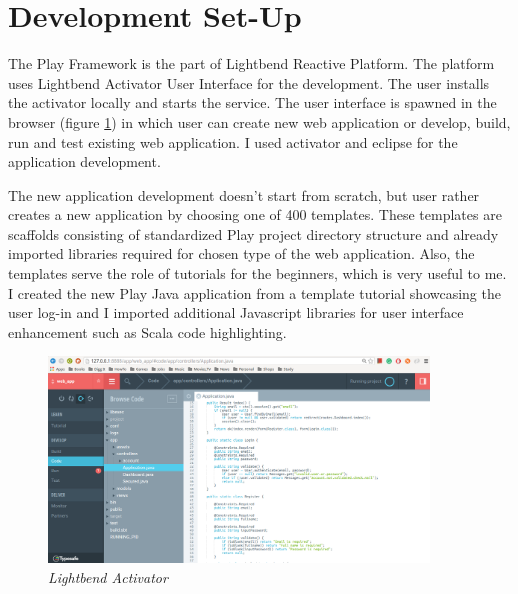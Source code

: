 \documentclass[12pt,twoside,a4paper]{report}
\begin{document}
\section{Development Set-Up}\label{4.2}
The Play Framework is the part of Lightbend Reactive Platform\cite{32}. The platform uses Lightbend Activator User Interface for the development. The user installs the activator locally and starts the service. The user interface is spawned in the browser (figure \ref{f4.2}) in which user can create new web application or develop, build, run and test existing web application. I used activator and eclipse for the application development.

The new application development doesn't start from scratch, but user rather creates a new application by choosing one of 400 templates. These templates are scaffolds consisting of standardized Play project directory structure and already imported libraries required for chosen type of the web application. Also, the templates serve the role of tutorials for the beginners, which is very useful to me. I created the new Play Java application from a template tutorial showcasing the user log-in and I imported additional Javascript libraries for user interface enhancement such as Scala code highlighting.

\begin{figure}[!ht]
	\centering
		\includegraphics[width=0.9\textwidth, totalheight=8cm]
		{activator}
	\caption{\textit{Lightbend Activator}}
	\label{f4.2}
\end{figure}

\end{document}
